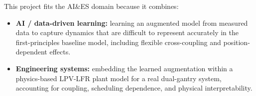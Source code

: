 This project fits the AI\&ES domain because it combines:
\begin{itemize}[noitemsep,topsep=2pt]
\item \textbf{AI / data-driven learning:} learning an augmented model from measured data to capture dynamics that are difficult to represent accurately in the first-principles baseline model, including flexible cross-coupling and position-dependent effects.
\item \textbf{Engineering systems:} embedding the learned augmentation within a physics-based LPV-LFR plant model for a real dual-gantry system, accounting for coupling, scheduling dependence, and physical interpretability.
\end{itemize}